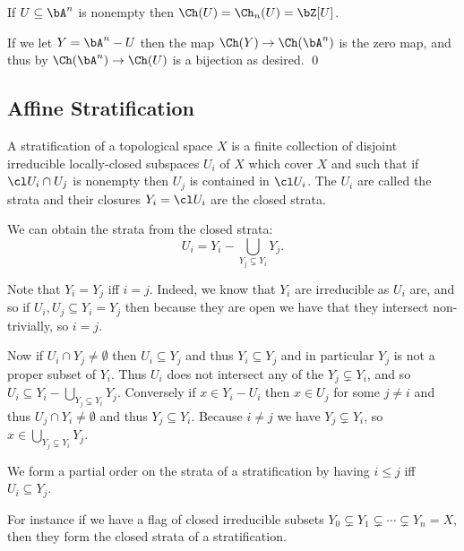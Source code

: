 \eproof

\bcoro[name={chowquasiaffine}]

    If $U\subseteq\bA^n$ is nonempty then $\Ch(U)=\Ch_n(U)=\bZ[U]$.

\ecoro

\bproof

    If we let $Y=\bA^n-U$ then the map $\Ch(Y)\to\Ch(\bA^n)$ is the zero map, and thus by
     $\Ch(\bA^n)\to\Ch(U)$ is a bijection as desired.
    \qed

\eproof

\subsection{Affine Stratification}

\bdefn

    A {\emphcolor stratification} of a topological space $X$ is a finite collection of disjoint irreducible locally-closed subspaces $U_i$ of $X$
    which cover $X$ and such that if $\cl U_i\cap U_j$ is nonempty then $U_j$ is contained in $\cl U_i$.
    The $U_i$ are called the {\emphcolor strata} and their closures $Y_i=\cl U_i$ are the {\emphcolor closed strata}.

\edefn

We can obtain the strata from the closed strata:
$$ U_i = Y_i - \bigcup_{Y_j\subsetneq Y_i}Y_j . $$

\bnote

    Note that $Y_i=Y_j$ iff $i=j$.
    Indeed, we know that $Y_i$ are irreducible as $U_i$ are, and so if $U_i,U_j\subseteq Y_i=Y_j$ then because they are open
    we have that they intersect non-trivially, so $i=j$.

    Now if $U_i\cap Y_j\neq\emptyset$ then $U_i\subseteq Y_j$ and thus $Y_i\subseteq Y_j$ and in particular $Y_j$ is not a proper
    subset of $Y_i$.
    Thus $U_i$ does not intersect any of the $Y_j\subsetneq Y_i$, and so $U_i\subseteq Y_i-\bigcup_{Y_j\subsetneq Y_i}Y_j$.
    Conversely if $x\in Y_i-U_i$ then $x\in U_j$ for some $j\neq i$ and thus $U_j\cap Y_i\neq\emptyset$ and thus $Y_j\subseteq Y_i$.
    Because $i\neq j$ we have $Y_j\subsetneq Y_i$, so $x\in\bigcup_{Y_j\subsetneq Y_i}Y_j$.

\enote

We form a partial order on the strata of a stratification by having $i\leq j$ iff $U_i\subseteq Y_j$.

For instance if we have a flag of closed irreducible subsets $Y_0\subsetneq Y_1\subsetneq\cdots\subsetneq Y_n=X$, then
they form the closed strata of a stratification.

